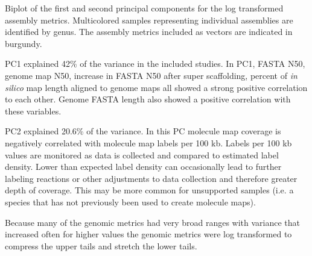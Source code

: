 Biplot of the first and second principal components for the log transformed assembly metrics. Multicolored samples representing individual assemblies are identified by genus. The assembly metrics included as vectors are indicated in burgundy.

PC1 explained 42\% of the variance in the included studies. In PC1, FASTA N50, genome map N50, increase in FASTA N50 after super scaffolding, percent of \textit{in silico} map length aligned to genome maps all showed a strong positive correlation to each other. Genome FASTA length also showed a positive correlation with these variables.

PC2 explained 20.6\% of the variance. In this PC molecule map coverage is negatively correlated with molecule map labels per 100 kb. Labels per 100 kb values are monitored as data is collected and compared to estimated label density. Lower than expected label density can occasionally lead to further labeling reactions or other adjustments to data collection and therefore greater depth of coverage. This may be more common for unsupported samples (i.e. a species that has not previously been used to create molecule maps).

Because many of the genomic metrics had very broad ranges with variance that increased often for higher values the genomic metrics were log transformed to compress the upper tails and stretch the lower tails.